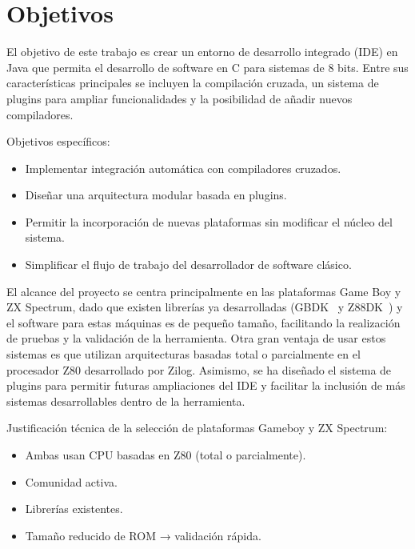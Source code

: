 \documentclass[../../main.tex]{subfiles}
\begin{document}
\section{Objetivos}
\label{S:objetivos}

El objetivo de este trabajo es crear un entorno de desarrollo integrado (IDE) en Java que permita el desarrollo de software en C para sistemas de 8 bits. Entre sus características principales se incluyen la compilación cruzada, un sistema de plugins para ampliar funcionalidades y la posibilidad de añadir nuevos compiladores.

Objetivos específicos:

\begin{itemize}
        \item Implementar integración automática con compiladores cruzados.
        \item Diseñar una arquitectura modular basada en plugins.
        \item Permitir la incorporación de nuevas plataformas sin modificar el núcleo del sistema.
        \item Simplificar el flujo de trabajo del desarrollador de software clásico.
    \end{itemize}

El alcance del proyecto se centra principalmente en las plataformas Game Boy y ZX Spectrum, dado que existen librerías ya desarrolladas (GBDK~\cite{gbdk} y Z88DK~\cite{z88dk}) y el software para estas máquinas es de pequeño tamaño, facilitando la realización de pruebas y la validación de la herramienta. Otra gran ventaja de usar estos sistemas es que utilizan arquitecturas basadas total o parcialmente en el procesador Z80 desarrollado por Zilog. Asimismo, se ha diseñado el sistema de plugins para permitir futuras ampliaciones del IDE y facilitar la inclusión de más sistemas desarrollables dentro de la herramienta.

Justificación técnica de la selección de plataformas Gameboy y ZX Spectrum:

\begin{itemize}
        \item Ambas usan CPU basadas en Z80 (total o parcialmente).
        \item Comunidad activa.
        \item Librerías existentes.
        \item Tamaño reducido de ROM → validación rápida.
    \end{itemize}
\end{document}
